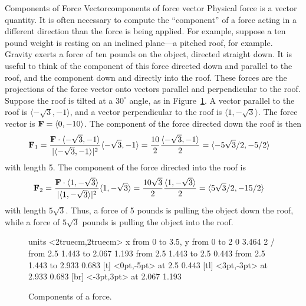 \begin{example}{Components of Force Vector}{components of force vector}
Physical force is a vector quantity. It is often necessary to compute
the ``component'' of a force acting in a different direction than the
force is being applied. For example, suppose a ten pound weight is
resting on an inclined plane---a pitched roof, for example. Gravity
exerts a force of ten pounds on the object, directed straight down. It
is useful to think of the component of this force directed down and
parallel to the roof, and the component down and directly into the
roof. These forces are the projections of the force vector onto
vectors parallel and perpendicular to the roof. Suppose the roof is
tilted at a $30^\circ$ angle, as in Figure~\ref{fig:components of force}.
A vector parallel to the roof is $\langle-\sqrt3,-1\rangle$,
and a vector perpendicular to the roof is
$\langle 1,-\sqrt3\rangle$.  The force vector is ${\bf F}=\langle
0,-10\rangle$. The component of the force directed down the roof is
then
\begin{align*}
  {\bf F}_1&={{\bf F}\cdot
  \langle-\sqrt3,-1\rangle\over|\langle-\sqrt3,-1\rangle|^2}
  \langle-\sqrt3,-1\rangle
  ={10\over 2}{\langle-\sqrt3,-1\rangle\over2}=
  \langle -5\sqrt3/2,-5/2\rangle
\end{align*}
with length 5.  The component of the force directed into the roof is
\begin{align*}
  {\bf F}_2&={{\bf F}\cdot
  \langle1,-\sqrt3\rangle\over|\langle1,-\sqrt3\rangle|^2}
  \langle1,-\sqrt3\rangle
={10\sqrt3\over 2}{\langle1,-\sqrt3\rangle\over2}=
\langle 5\sqrt3/2,-15/2\rangle\cr
\end{align*}
with length $5\sqrt3$. Thus, a force of 5 pounds is pulling the object
down the roof, while a force of $5\sqrt3$ pounds is pulling the object
into the roof.
\end{example}

\begin{figure}[H]
\centerline{
\vbox{\beginpicture
\normalgraphs
\setcoordinatesystem units <2truecm,2truecm>
\setplotarea x from 0 to 3.5, y from 0 to 2
 0 3.464 2 /
\arrow <4pt> [0.35, 1] from 2.5 1.443 to 2.067 1.193
\arrow <4pt> [0.35, 1] from 2.5 1.443 to 2.5 0.443
\arrow <4pt> [0.35, 1] from 2.5 1.443 to 2.933 0.683
 [t] <0pt,-5pt> at 2.5 0.443
 [tl] <3pt,-3pt> at 2.933 0.683
 [br] <-3pt,3pt> at 2.067 1.193
\endpicture}}
\caption{Components of a force. \label{fig:components of force}}
\end{figure}

